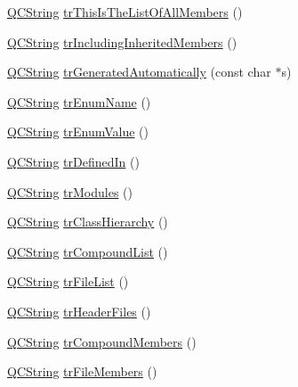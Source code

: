 \begin{DoxyCompactItemize}
\item 
\mbox{\hyperlink{class_q_c_string}{Q\+C\+String}} \mbox{\hyperlink{class_translator_polish_a758732cefd26fb28599e42ca9af87b4e}{tr\+This\+Is\+The\+List\+Of\+All\+Members}} ()
\item 
\mbox{\hyperlink{class_q_c_string}{Q\+C\+String}} \mbox{\hyperlink{class_translator_polish_a1a4e6470756f228d2393106764fd72bb}{tr\+Including\+Inherited\+Members}} ()
\item 
\mbox{\hyperlink{class_q_c_string}{Q\+C\+String}} \mbox{\hyperlink{class_translator_polish_a0ac0faca1141da2427d0f0f8fa2cd798}{tr\+Generated\+Automatically}} (const char $\ast$s)
\item 
\mbox{\hyperlink{class_q_c_string}{Q\+C\+String}} \mbox{\hyperlink{class_translator_polish_ab8fccd21d327bd70d9f391bf84e052c5}{tr\+Enum\+Name}} ()
\item 
\mbox{\hyperlink{class_q_c_string}{Q\+C\+String}} \mbox{\hyperlink{class_translator_polish_a1a96005738f33bd7724413dfcfb555f7}{tr\+Enum\+Value}} ()
\item 
\mbox{\hyperlink{class_q_c_string}{Q\+C\+String}} \mbox{\hyperlink{class_translator_polish_ab629c2f61dfc9c5c0999c0121afd5f8a}{tr\+Defined\+In}} ()
\item 
\mbox{\hyperlink{class_q_c_string}{Q\+C\+String}} \mbox{\hyperlink{class_translator_polish_a8119325d06437d3a3b76a0b4546927fc}{tr\+Modules}} ()
\item 
\mbox{\hyperlink{class_q_c_string}{Q\+C\+String}} \mbox{\hyperlink{class_translator_polish_a03be7582d6855399a38f76901e0b8f89}{tr\+Class\+Hierarchy}} ()
\item 
\mbox{\hyperlink{class_q_c_string}{Q\+C\+String}} \mbox{\hyperlink{class_translator_polish_ada057fd3ef44bcd29f2048b79089417e}{tr\+Compound\+List}} ()
\item 
\mbox{\hyperlink{class_q_c_string}{Q\+C\+String}} \mbox{\hyperlink{class_translator_polish_a338ca2e1ddddafaa41338ca875bee281}{tr\+File\+List}} ()
\item 
\mbox{\hyperlink{class_q_c_string}{Q\+C\+String}} \mbox{\hyperlink{class_translator_polish_a748d9793a3a011afa12158c3a4d63f8e}{tr\+Header\+Files}} ()
\item 
\mbox{\hyperlink{class_q_c_string}{Q\+C\+String}} \mbox{\hyperlink{class_translator_polish_ae99640a160ae514a3bfde7b92802d880}{tr\+Compound\+Members}} ()
\item 
\mbox{\hyperlink{class_q_c_string}{Q\+C\+String}} \mbox{\hyperlink{class_translator_polish_ac61982acc3dc6c319991f92d1667a638}{tr\+File\+Members}} ()

\end{DoxyCompactItemize}
